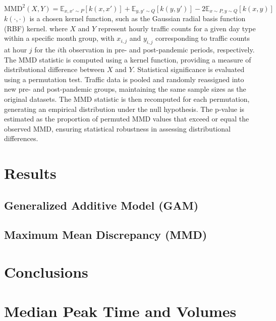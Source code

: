 \documentclass{article}
\begin{document}
$$
\text{MMD}^2(X, Y) = \mathbb{E}_{x, x' \sim P} [k(x, x')] + \mathbb{E}_{y, y' \sim Q} [k(y, y')] - 2\mathbb{E}_{x \sim P, y \sim Q} [k(x, y)]
$$
$k(\cdot, \cdot)$ is a chosen kernel function, such as the Gaussian radial basis function (RBF) kernel.
where $X$ and $Y$ represent hourly traffic counts for a given day type within a specific month group, with $x_{i,j}$ and $y_{i,j}$ corresponding to traffic counts at hour $j$ for the $i$th observation in pre- and post-pandemic periods, respectively. The MMD statistic is computed using a kernel function, providing a measure of distributional difference between $X$ and $Y$.
Statistical significance is evaluated using a permutation test. Traffic data is pooled and randomly reassigned into new pre- and post-pandemic groups, maintaining the same sample sizes as the original datasets. The MMD statistic is then recomputed for each permutation, generating an empirical distribution under the null hypothesis. The p-value is estimated as the proportion of permuted MMD values that exceed or equal the observed MMD, ensuring statistical robustness in assessing distributional differences.

\section{Results}

\subsection{Generalized Additive Model (GAM)}

\subsection{Maximum Mean Discrepancy (MMD)}

\section{Conclusions}

\appendix

\section{Median Peak Time and Volumes}
\end{document}
